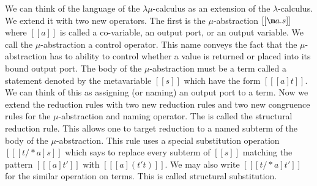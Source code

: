 We can think of the language of the $\lambda\mu$-calculus as an
extension of the $\lambda$-calculus.  We extend it with two new
operators.  The first is the $\mu$-abstraction $[[\m a.s]]$ where
$[[a]]$ is called a co-variable, an output port, or an output
variable.  We call the $\mu$-abstraction a control operator.  This
name conveys the fact that the $\mu$-abstraction has to ability to
control whether a value is returned or placed into its bound output
port.  The body of the $\mu$-abstraction must be a term called a
statement denoted by the metavariable $[[s]]$ which have the form $[[
    [a]t]]$.  We can think of this as assigning (or naming) an output
port to a term.  Now we extend the reduction rules with two new
reduction rules and two new congruence rules for the $\mu$-abstraction
and naming operator.  The  is called the
structural reduction rule.  This allows one to target reduction to a
named subterm of the body of the $\mu$-abstraction.  This rule uses
a special substitution operation $[[ [t /* a]s]]$ which says to 
replace every subterm of $[[s]]$ matching the pattern $[[ [a]t']]$
with $[[ [a](t' t)]]$.  We may also write $[[ [t /* a]t']]$ for the
similar operation on terms. This is called structural substitution.

